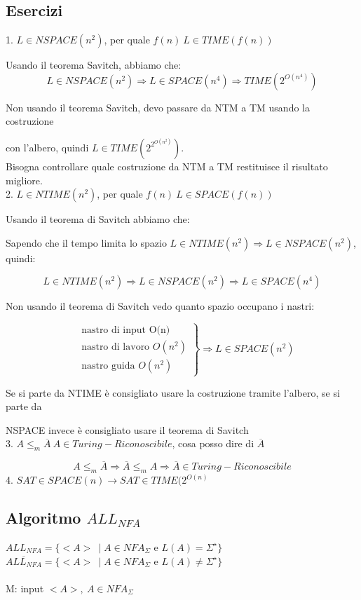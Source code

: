 \subsection{Esercizi}
1. $L \in NSPACE(n^2)$, per quale $f(n) \ L \in TIME(f(n))$

Usando il teorema Savitch, abbiamo che:
\[
	L \in NSPACE(n^2) \Rightarrow L \in SPACE(n^4) \Rightarrow TIME(2^{O(n^4)})
\]

Non usando il teorema Savitch, devo passare da NTM a TM usando la costruzione

con l'albero, quindi $L \in TIME(2^{2^{O(n^2)}})$.
\\

Bisogna controllare quale costruzione da NTM a TM restituisce il risultato migliore.
\\
2. $L \in NTIME(n^2)$, per quale $f(n) \ L \in SPACE(f(n))$

Usando il teorema di Savitch abbiamo che:


Sapendo che il tempo limita lo spazio $L \in NTIME(n^2) \Rightarrow L \in NSPACE(n^2)$, quindi:

\[
	L \in NTIME(n^2) \Rightarrow L \in NSPACE(n^2) \Rightarrow L \in SPACE(n^4)
\]

Non usando il teorema di Savitch vedo quanto spazio occupano i nastri:

\[
\left.
\begin{aligned}
&\text{nastro di input O(n)}\\
&\text{nastro di lavoro $O(n^2)$}\\
&\text{nastro guida $O(n^2)$}
\end{aligned}
\right\rbrace
\text{$\Rightarrow L \in SPACE(n^2)$}
\]

Se si parte da NTIME è consigliato usare la costruzione tramite l'albero, se si parte da 

NSPACE invece è consigliato usare il teorema di Savitch
\\
3. $A \leq_{m} \overline{A} \ A \in Turing-Riconoscibile$, cosa posso dire di $\overline{A}$

\[
	A \leq_{m} \overline{A} \Rightarrow \overline{A} \leq_{m} A \Rightarrow \overline{A} \in Turing-Riconoscibile
\]
4. $SAT \in SPACE(n) \rightarrow SAT \in TIME(2^{O(n)}$
\subsection{Algoritmo $ALL_{NFA}$}
$ALL_{NFA} = \{ <A> \ \mid A \in NFA_{\Sigma} \text{ e } L(A)=\Sigma^{\star} \}$
\\
$\overline{ALL_{NFA}} = \{ <A> \ \mid A \in NFA_{\Sigma} \text{ e } L(A) \neq \Sigma^{\star} \}$
\\\\
M: input $<A>, \ A \in NFA_{\Sigma}$

